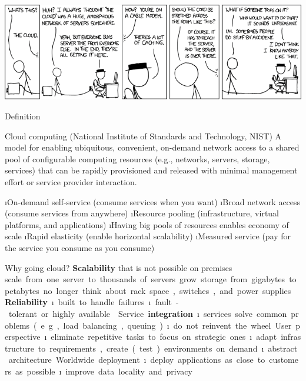 

\begin{frame}
\includegraphics[width=\textwidth]{imgs/xkcd_cloud.png}
\end{frame}


\begin{frame}{Definition}
\begin{block}{Cloud computing (National Institute of Standards and Technology, NIST)}
A model for enabling ubiquitous, convenient, on-demand network access to a shared pool of configurable computing resources (e.g., networks, servers, storage, services) that can be rapidly provisioned and released with minimal management effort or service provider interaction. 
\end{block}

\i On-demand self-service (consume services when you want)
\i Broad network access (consume services from anywhere)
\i Resource pooling (infrastructure, virtual platforms, and applications)
\i Having big pools of resources enables economy of scale
\i Rapid elasticity (enable horizontal scalability)
\i Measured service (pay for the service you consume as you consume)
\end{frame}

\begin{frame}[allowframebreaks]{Why going cloud?}
\textbf{Scalability} that is not possible on premises
\si scale from one server to thousands
of servers
\si grow storage from gigabytes to petabytes
\si no longer think about rack space, switches, and power supplies

\textbf{Reliability} 
\i built to handle failures
\i fault-tolerant or highly available

\framebreak

Service \textbf{integration}
\i services solve common problems (e.g., load balancing, queuing)
\i do not reinvent the wheel

User perspective
\i eliminate repetitive tasks to focus on strategic ones
\i adapt infrastructure to requirements, create (test) environments on demand
\i abstract architecture

Worldwide deployment
\i deploy applications as close to customers as possible
\i improve data locality and privacy
\end{frame}

